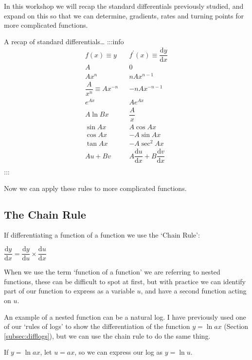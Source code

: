 \documentclass[
]{book}
\begin{document}
In this workshop we will recap the standard differentials previously studied, and expand on this so that we can determine, gradients, rates and turning points for more complicated functions.

A recap of standard differentials\ldots{}
:::info
\begin{equation*}
\begin{array}{ccc}
  f(x) \equiv y & & f^{\prime}(x) \equiv \dfrac{\textrm{d}y}{\textrm{d}x}\\
  \hline
A & &0 \\
 Ax^n & &nAx^{n-1} \\
 \dfrac{A}{x^n} \equiv A x^{-n} & &-nA x^{-n-1} \\
e^{Ax} & &Ae^{Ax} \\
A \ln Bx & &\dfrac{A}{x} \\
\sin Ax & &A\cos Ax \\
\cos Ax & &-A\sin Ax \\
\tan Ax & &-A\sec^2 Ax \\
Au + Bv & &A\dfrac{\textrm{d}u}{\textrm{d}x} + B\dfrac{\textrm{d}v}{\textrm{d}x} \\
\end{array}
\end{equation*}
:::

Now we can apply these rules to more complicated functions.

\hypertarget{subsec:chainrule}{%
\subsection{The Chain Rule}\label{subsec:chainrule}}

If differentiating a function of a function we use the `Chain Rule':

\(\dfrac{\textrm{d}y}{\textrm{d}x}=\dfrac{\textrm{d}y}{\textrm{d}u} \times \dfrac{\textrm{d}u}{\textrm{d}x}\)

When we use the term `function of a function' we are referring to nested functions, these can be difficult to spot at first, but with practice we can identify part of our function to express as a variable \(u\), and have a second function acting on \(u\).

An example of a nested function can be a natural log. I have previously used one of our `rules of logs' to show the differentiation of the function \(y = \ln ax\) (Section \ref{subsec:difflogs}), but we can use the chain rule to do the same thing.

If \(y = \ln {ax}\), let \(u=ax\), so we can express our log as \(y = \ln u\).
\end{document}
